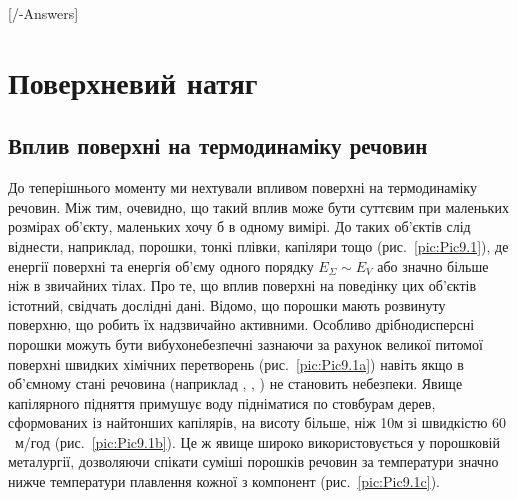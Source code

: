 
\setcounter{chapter}{8}

[\currfilebase/\currfilebase-Answers]
\chapter{Поверхневий натяг}\label{\currfilebase}
\graphicspath{{\currfilebase/pictures}}
\makeatletter
{}
\makeatother

\section{Вплив поверхні на термодинаміку речовин}

До теперішнього моменту ми нехтували впливом поверхні на термодинаміку речовин. Між тим, очевидно, що такий вплив може бути суттєвим при маленьких розмірах об’єкту, маленьких хочу б в одному вимірі. До таких об’єктів слід віднести, наприклад, порошки, тонкі плівки, капіляри тощо (рис.~\ref{pic:Pic9.1}), де енергії поверхні та енергія об'єму одного порядку $E_\Sigma \sim E_V$ або значно більше ніж в звичайних тілах. Про те, що вплив поверхні на поведінку цих об’єктів істотний, свідчать дослідні дані. Відомо, що порошки мають розвинуту поверхню, що робить їх надзвичайно активними. Особливо дрібнодисперсні порошки можуть бути вибухонебезпечні зазнаючи за рахунок великої питомої поверхні швидких хімічних перетворень (рис.~\ref{pic:Pic9.1a}) навіть якщо в об’ємному стані речовина (наприклад , , ) не становить небезпеки. Явище капілярного підняття примушує воду підніматися по стовбурам дерев, сформованих із найтонших капілярів, на висоту більше, ніж 10м зі швидкістю $60$~м/год (рис.~\ref{pic:Pic9.1b}). Це ж явище широко використовується у порошковій металургії, дозволяючи спікати суміші порошків речовин за температури значно нижче температури плавлення кожної з компонент (рис.~\ref{pic:Pic9.1c}).

